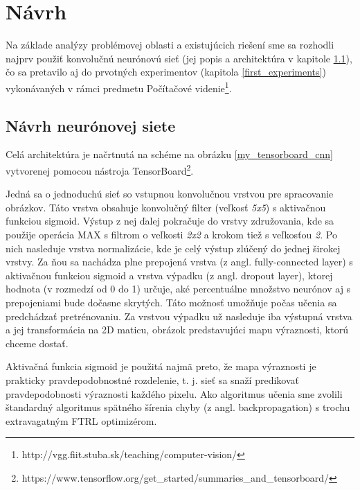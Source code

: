 \newpage

\section{Návrh}

Na základe analýzy problémovej oblasti a existujúcich riešení sme sa rozhodli najprv použiť konvolučnú neurónovú sieť (jej popis a architektúra v kapitole \ref{nn_popis}), čo sa pretavilo aj do prvotných experimentov (kapitola \ref{first_experiments}) vykonávaných v rámci predmetu Počítačové videnie\footnote{http://vgg.fiit.stuba.sk/teaching/computer-vision/}.

\subsection{Návrh neurónovej siete}
\label{nn_popis}

Celá architektúra je načrtnutá na schéme na obrázku \ref{my_tensorboard_cnn} vytvorenej pomocou nástroja  TensorBoard\footnote{https://www.tensorflow.org/get\_started/summaries\_and\_tensorboard/}.

Jedná sa o jednoduchú sieť so vstupnou konvolučnou vrstvou pre spracovanie obrázkov. Táto vrstva obsahuje konvolučný filter (veľkosť \textit{5x5}) s aktivačnou funkciou sigmoid. Výstup z nej ďalej pokračuje do vrstvy združovania, kde sa použije operácia MAX s filtrom o veľkosti \textit{2x2} a krokom tiež s veľkosťou \textit{2}. Po nich nasleduje vrstva normalizácie, kde je celý výstup zlúčený do jednej širokej vrstvy. Za ňou sa nachádza plne prepojená vrstva (z angl. fully-connected layer) s aktivačnou funkciou sigmoid a vrstva výpadku (z angl. dropout layer\cite{dropout}), ktorej hodnota (v rozmedzí od 0 do 1) určuje, aké percentuálne množstvo neurónov aj s prepojeniami bude dočasne skrytých. Táto možnosť umožňuje počas učenia sa predchádzať pretrénovaniu. Za vrstvou výpadku už nasleduje iba výstupná vrstva a jej transformácia na 2D maticu, obrázok predstavujúci mapu výraznosti, ktorú chceme dostať.

Aktivačná funkcia sigmoid je použitá najmä preto, že mapa výraznosti je prakticky pravdepodobnostné rozdelenie, t. j. sieť sa snaží predikovať pravdepodobnosti výraznosti každého pixelu. Ako algoritmus učenia sme zvolili štandardný algoritmus spätného šírenia chyby (z angl. backpropagation) s trochu extravagatným FTRL optimizérom.

